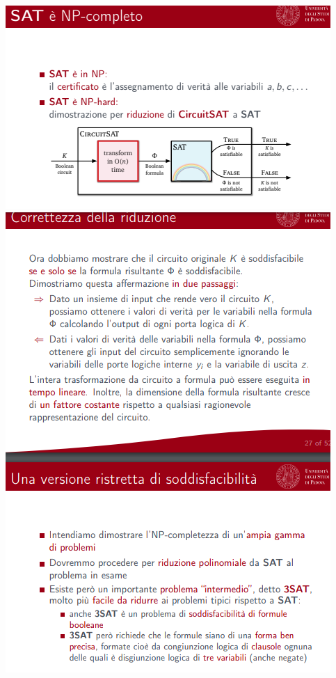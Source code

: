 \documentclass[]{article}
\begin{document}
\begin{center}
				\includegraphics[scale=0.8]{NP8.png}
				\includegraphics[scale=0.8]{NP9.png}

\end{center}
\end{document}
